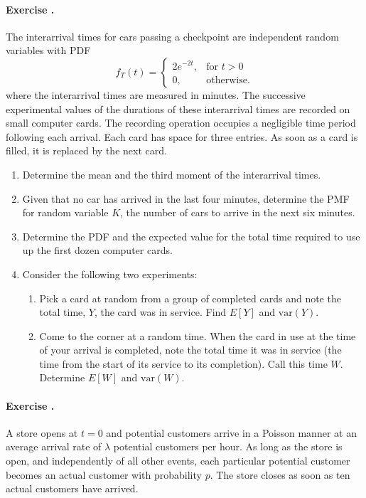 \documentclass[twocolumn,12pt,a4paper]{article}
\newcounter{num}  %
\begin{document}
		\paragraph{Exercise \thenum.}		
		The interarrival times for cars passing a checkpoint are independent random variables with PDF
		$$
		f_T(t) = 
		\begin{cases} 
			2e^{-2t}, & \text{for } t > 0 \\
			0, & \text{otherwise.}
		\end{cases}
		$$
		where the interarrival times are measured in minutes. The successive experimental values of the durations of these interarrival times are recorded on small computer cards. The recording operation occupies a negligible time period following each arrival. Each card has space for three entries. As soon as a card is filled, it is replaced by the next card.
		
		\begin{enumerate}
			\item Determine the mean and the third moment of the interarrival times.
			\item Given that no car has arrived in the last four minutes, determine the PMF for random variable $ K $, the number of cars to arrive in the next six minutes.
			\item Determine the PDF and the expected value for the total time required to use up the first dozen computer cards.
			\item Consider the following two experiments:
			\begin{enumerate}
				\item Pick a card at random from a group of completed cards and note the total time, $ Y $, the card was in service. Find $ E[Y] $ and $ \text{var}(Y) $.
				\item Come to the corner at a random time. When the card in use at the time of your arrival is completed, note the total time it was in service (the time from the start of its service to its completion). Call this time $ W $. Determine $ E[W] $ and $ \text{var}(W) $.
			\end{enumerate}
		\end{enumerate}
		
	
	

		
		\paragraph{Exercise \thenum.}
		 A store opens at $ t = 0 $ and potential customers arrive in a Poisson manner at an average arrival rate of $ \lambda $ potential customers per hour. As long as the store is open, and independently of all other events, each particular potential customer becomes an actual customer with probability $ p $. The store closes as soon as ten actual customers have arrived.
		
\end{document}
